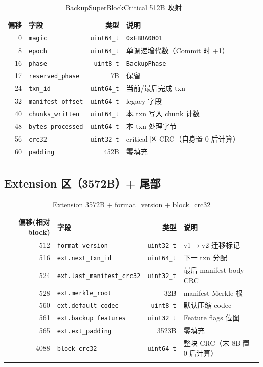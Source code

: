 \begin{longtable}{@{}rlrp{6.5cm}@{}}
\toprule
偏移 & 字段 & 类型 & 说明 \\
\midrule
0 & \texttt{magic} & \texttt{uint64\_t} & \texttt{0xEBBA0001} \\
8 & \texttt{epoch} & \texttt{uint64\_t} & 单调递增代数（Commit 时 +1） \\
16 & \texttt{phase} & \texttt{uint8\_t} & \texttt{BackupPhase} \\
17 & \texttt{reserved\_phase} & 7B & 保留 \\
24 & \texttt{txn\_id} & \texttt{uint64\_t} & 当前/最后完成 txn \\
32 & \texttt{manifest\_offset} & \texttt{uint64\_t} & legacy 字段 \\
40 & \texttt{chunks\_written} & \texttt{uint64\_t} & 本 txn 写入 chunk 计数 \\
48 & \texttt{bytes\_processed} & \texttt{uint64\_t} & 本 txn 处理字节 \\
56 & \texttt{crc32} & \texttt{uint32\_t} & critical 区 CRC（自身置 0 后计算） \\
60 & \texttt{padding} & 452B & 零填充 \\
\bottomrule
\caption{BackupSuperBlockCritical 512B 映射}
\end{longtable}

\subsection{Extension 区（3572B）+ 尾部}

\begin{longtable}{@{}rlrp{6.5cm}@{}}
\toprule
偏移(相对 block) & 字段 & 类型 & 说明 \\
\midrule
512 & \texttt{format\_version} & \texttt{uint32\_t} & v1$\rightarrow$v2 迁移标记 \\
516 & \texttt{ext.next\_txn\_id} & \texttt{uint64\_t} & 下一 txn 分配 \\
524 & \texttt{ext.last\_manifest\_crc32} & \texttt{uint32\_t} & 最后 manifest body CRC \\
528 & \texttt{ext.merkle\_root} & 32B & manifest Merkle 根 \\
560 & \texttt{ext.default\_codec} & \texttt{uint8\_t} & 默认压缩 codec \\
561 & \texttt{ext.backup\_features} & \texttt{uint32\_t} & Feature flags 位图 \\
565 & \texttt{ext.ext\_padding} & 3523B & 零填充 \\
4088 & \texttt{block\_crc32} & \texttt{uint64\_t} & 整块 CRC（末 8B 置 0 后计算） \\
\bottomrule
\caption{Extension 3572B + format\_version + block\_crc32}
\end{longtable}

